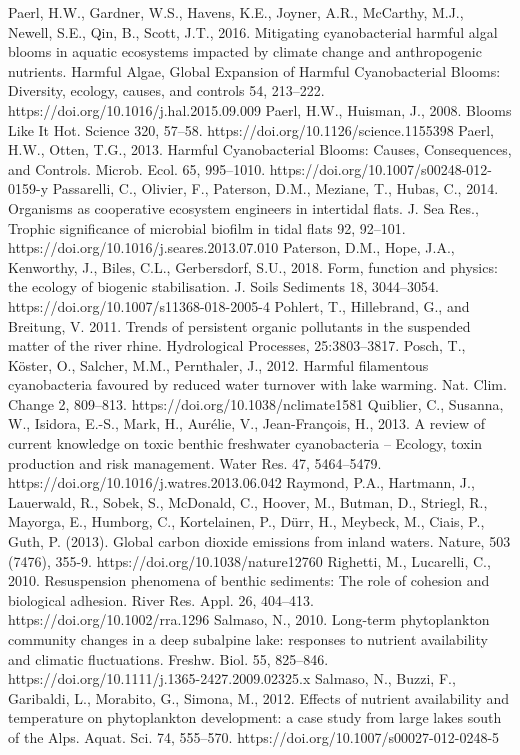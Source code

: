 \begin{thebibliography}{}
Paerl, H.W., Gardner, W.S., Havens, K.E., Joyner, A.R., McCarthy, M.J., Newell, S.E., Qin, B., Scott, J.T., 2016. Mitigating cyanobacterial harmful algal blooms in aquatic ecosystems impacted by climate change and anthropogenic nutrients. Harmful Algae, Global Expansion of Harmful Cyanobacterial Blooms: Diversity, ecology, causes, and controls 54, 213–222. https://doi.org/10.1016/j.hal.2015.09.009
Paerl, H.W., Huisman, J., 2008. Blooms Like It Hot. Science 320, 57–58. https://doi.org/10.1126/science.1155398
Paerl, H.W., Otten, T.G., 2013. Harmful Cyanobacterial Blooms: Causes, Consequences, and Controls. Microb. Ecol. 65, 995–1010. https://doi.org/10.1007/s00248-012-0159-y
Passarelli, C., Olivier, F., Paterson, D.M., Meziane, T., Hubas, C., 2014. Organisms as cooperative ecosystem engineers in intertidal flats. J. Sea Res., Trophic significance of microbial biofilm in tidal flats 92, 92–101. https://doi.org/10.1016/j.seares.2013.07.010
Paterson, D.M., Hope, J.A., Kenworthy, J., Biles, C.L., Gerbersdorf, S.U., 2018. Form, function and physics: the ecology of biogenic stabilisation. J. Soils Sediments 18, 3044–3054. https://doi.org/10.1007/s11368-018-2005-4
Pohlert, T., Hillebrand, G., and Breitung, V. 2011. Trends of persistent organic pollutants in the suspended matter of the river rhine. Hydrological Processes, 25:3803–3817.
Posch, T., Köster, O., Salcher, M.M., Pernthaler, J., 2012. Harmful filamentous cyanobacteria favoured by reduced water turnover with lake warming. Nat. Clim. Change 2, 809–813. https://doi.org/10.1038/nclimate1581
Quiblier, C., Susanna, W., Isidora, E.-S., Mark, H., Aurélie, V., Jean-François, H., 2013. A review of current knowledge on toxic benthic freshwater cyanobacteria – Ecology, toxin production and risk management. Water Res. 47, 5464–5479. https://doi.org/10.1016/j.watres.2013.06.042
Raymond, P.A., Hartmann, J., Lauerwald, R., Sobek, S., McDonald, C., Hoover, M., Butman, D., Striegl, R., Mayorga, E., Humborg, C., Kortelainen, P., Dürr, H., Meybeck, M., Ciais, P., Guth, P. (2013). Global carbon dioxide emissions from inland waters. Nature, 503 (7476), 355-9. https://doi.org/10.1038/nature12760
Righetti, M., Lucarelli, C., 2010. Resuspension phenomena of benthic sediments: The role of cohesion and biological adhesion. River Res. Appl. 26, 404–413. https://doi.org/10.1002/rra.1296
Salmaso, N., 2010. Long-term phytoplankton community changes in a deep subalpine lake: responses to nutrient availability and climatic fluctuations. Freshw. Biol. 55, 825–846. https://doi.org/10.1111/j.1365-2427.2009.02325.x
Salmaso, N., Buzzi, F., Garibaldi, L., Morabito, G., Simona, M., 2012. Effects of nutrient availability and temperature on phytoplankton development: a case study from large lakes south of the Alps. Aquat. Sci. 74, 555–570. https://doi.org/10.1007/s00027-012-0248-5

\end{thebibliography}
